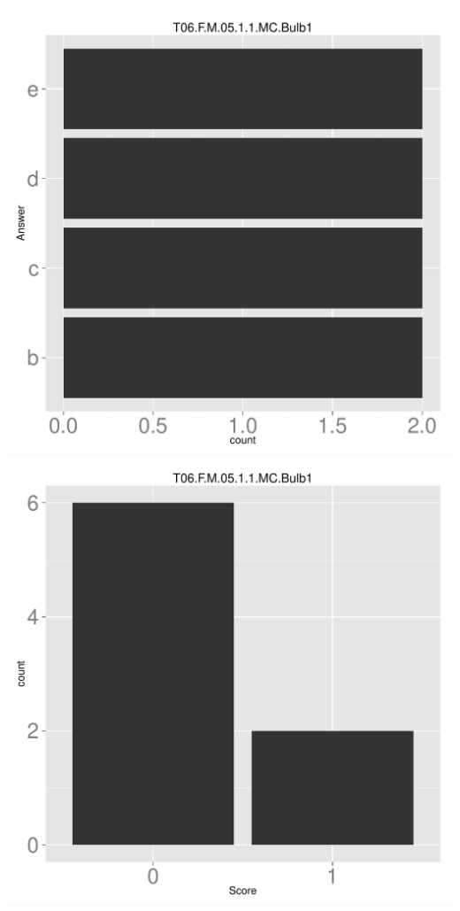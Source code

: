 \documentclass[12pt,english,nohyper]{tufte-handout}\usepackage[]{graphicx}\usepackage[]{color}
\begin{document}
\begin{center} \includegraphics[width=.45\linewidth]{Topic06_AB_46_answer} \includegraphics[width=.45\linewidth]{Topic06_AB_46_score} \end{center} 
\end{document}
